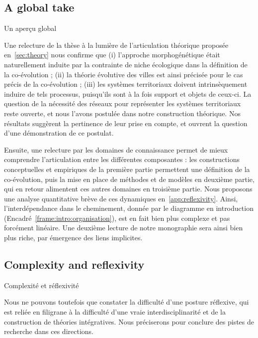 \subsection*{A global take}{Un aperçu global}


Une relecture de la thèse à la lumière de l'articulation théorique proposée en~\ref{sec:theory} nous confirme que (i) l'approche morphogénétique était naturellement induite par la contrainte de niche écologique dans la définition de la co-évolution ; (ii) la théorie évolutive des villes est ainsi précisée pour le cas précis de la co-évolution ; (iii) les systèmes territoriaux doivent intrinsèquement induire de tels processus, puisqu'ils sont à la fois support et objets de ceux-ci. La question de la nécessité des réseaux pour représenter les systèmes territoriaux reste ouverte, et nous l'avons postulée dans notre construction théorique. Nos résultats suggèrent la pertinence de leur prise en compte, et ouvrent la question d'une démonstration de ce postulat.


Ensuite, une relecture par les domaines de connaissance permet de mieux comprendre l'articulation entre les différentes composantes : les constructions conceptuelles et empiriques de la première partie permettent une définition de la co-évolution, puis la mise en place de méthodes et de modèles en deuxième partie, qui en retour alimentent ces autres domaines en troisième partie. Nous proposons une analyse quantitative brève de ces dynamiques en~\ref{app:reflexivity}. Ainsi, l'interdépendance dans le cheminement, donnée par le diagramme en introduction (Encadré~\ref{frame:intro:organisation}), est en fait bien plus complexe et pas forcément linéaire. Une deuxième lecture de notre monographie sera ainsi bien plus riche, par émergence des liens implicites.



\subsection*{Complexity and reflexivity}{Complexité et réflexivité}


Nous ne pouvons toutefois que constater la difficulté d'une posture réflexive, qui est reliée en filigrane à la difficulté d'une vraie interdisciplinarité et de la construction de théories intégratives. Nous préciserons pour conclure des pistes de recherche dans ces directions.




\stars



